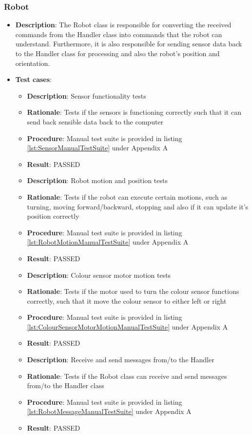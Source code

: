 \documentclass[12pt,a4paper]{article}
\begin{document}
	\subsubsection{Robot}
	\begin{itemize}
	\item \textbf{Description}: The Robot class is responsible for converting the received commands from the Handler class into commands that the robot can understand. Furthermore, it is also responsible for sending sensor data back to the Handler class for processing and also the robot's position and orientation.
	\item \textbf{Test cases}:
	\begin{itemize}
		\item \textbf{Description}:	Sensor functionality tests
		\item \textbf{Rationale}:	Tests if the sensors is functioning correctly such that it can send back sensible data back to the computer
		\item \textbf{Procedure}:	Manual test suite is provided in listing \ref{lst:SensorManualTestSuite} under Appendix A
		\item \textbf{Result}:		PASSED
	\end{itemize}
	\begin{itemize}
		\item \textbf{Description}:	Robot motion and position tests
		\item \textbf{Rationale}:	Tests if the robot can execute certain motions, such as turning, moving forward/backward, stopping and also if it can update it's position correctly
		\item \textbf{Procedure}:	Manual test suite is provided in listing \ref{lst:RobotMotionManualTestSuite} under Appendix A
		\item \textbf{Result}:		PASSED
	\end{itemize}
	\begin{itemize}
		\item \textbf{Description}:	Colour sensor motor motion tests
		\item \textbf{Rationale}:	Tests if the motor used to turn the colour sensor functions correctly, such that it move the colour sensor to either left or right
		\item \textbf{Procedure}:	Manual test suite is provided in listing \ref{lst:ColourSensorMotorMotionManualTestSuite} under Appendix A
		\item \textbf{Result}:		PASSED
	\end{itemize}
	\begin{itemize}
		\item \textbf{Description}:	Receive and send messages from/to the Handler
		\item \textbf{Rationale}:	Tests if the Robot class can receive and send messages from/to the Handler class
		\item \textbf{Procedure}:	Manual test suite is provided in listing \ref{lst:RobotMessageManualTestSuite} under Appendix A
		\item \textbf{Result}:		PASSED
	\end{itemize}
	\end{itemize}
	
\end{document}
